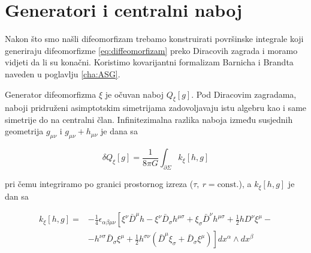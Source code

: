 \section{Generatori i centralni naboj}\label{sec:Generator}

Nakon što smo našli difeomorfizam trebamo konstruirati površinske integrale koji generiraju difeomorfizme \eqref{eq:diffeomorfizam} preko Diracovih zagrada i moramo vidjeti da li su konačni. Koristimo kovarijantni formalizam Barnicha i Brandta \citep{Barnich:2001jy} naveden u poglavlju \ref{cha:ASG}.

\noindent Generator difeomorfizma $\xi$ je očuvan naboj $Q_\xi[g]$. Pod Diracovim zagradama, naboji pridruženi asimptotskim simetrijama zadovoljavaju istu algebru kao i same simetrije do na centralni član. Infinitezimalna razlika naboja između susjednih geometrija $g_{\mu\nu}$ i $g_{\mu\nu}+h_{\mu\nu}$ je dana sa

\begin{equation}
\delta Q_\xi[g]=\frac{1}{8\pi G}\int_{\partial\Sigma}k_\xi[h,g]
\end{equation}

\noindent pri čemu integriramo po granici prostornog izreza ($\tau,\ r=\textrm{const.}$), a $k_\xi[h,g]$ je dan sa

\begin{equation}
\begin{split}
k_\xi[h,g]=&-\frac{1}{4}\epsilon_{\alpha\beta\mu\nu}\left[\xi^\nu \bar{D}^\mu h-\xi^\nu \bar{D}_\sigma h^{\mu\sigma}+\xi_\sigma\bar{D}^\nu h^{\mu\sigma}+\frac{1}{2}h D^\nu\xi^\mu-\right.\\
&-\left.h^{\nu\sigma}\bar{D}_\sigma\xi^\mu
+\frac{1}{2}h^{\sigma\nu}(\bar{D}^\mu\xi_\sigma+\bar{D}_\sigma\xi^\mu)\right]dx^\alpha\wedge dx^\beta
\end{split}
\label{eq:superpotenc}
\end{equation}




